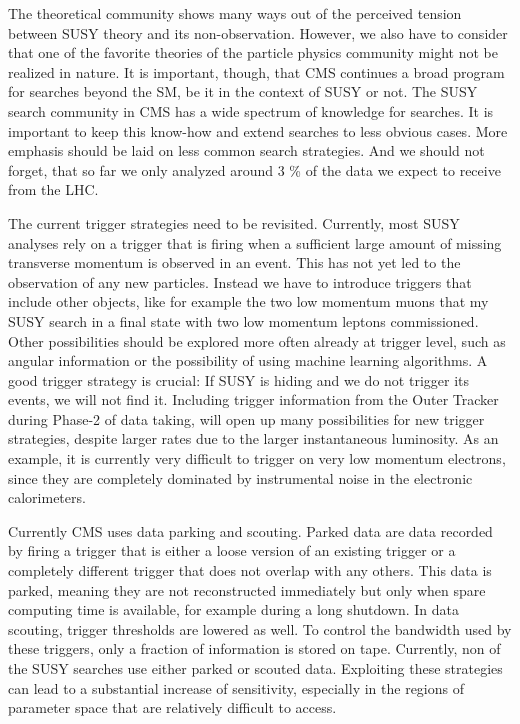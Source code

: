 \documentclass[]{cv} %
\begin{document}
\begin{statement}
The theoretical community shows many ways out of the perceived tension between
SUSY theory and its non-observation. However, we also have to consider that one
of the favorite theories of the particle physics community might not be realized
in nature. It is important, though, that CMS continues a broad program for
searches beyond the SM, be it in the context of SUSY or not. The SUSY search
community in CMS has a wide spectrum of knowledge for searches. It is important
to keep this know-how and extend searches to less obvious cases. More emphasis
should be laid on less common search strategies. And we should not forget, that
so far we only analyzed around 3 \% of the data we expect to receive from the LHC.

The current trigger strategies need to be revisited. Currently, most SUSY
analyses rely on a trigger that is firing when a sufficient large amount of
missing transverse momentum is observed in an event. This has not yet led to the
observation of any new particles. Instead we have to introduce triggers that
include other objects, like for example the two low momentum muons that my SUSY
search in a final state with two low momentum leptons commissioned. Other
possibilities should be explored more often already at trigger level, such as
angular information or the possibility of using machine learning algorithms. A
good trigger strategy is crucial: If SUSY is hiding and we do not trigger its
events, we will not find it. Including trigger information from the Outer
Tracker during Phase-2 of data taking, will open up many possibilities for new
trigger strategies, despite larger rates due to the larger instantaneous
luminosity. As an example, it is currently very difficult to trigger on very low
momentum electrons, since they are completely dominated by instrumental noise in
the electronic calorimeters.

Currently CMS uses data parking and scouting. Parked data are data recorded by
firing a trigger that is either a loose version of an existing trigger or a
completely different trigger that does not overlap with any others. This data is
parked, meaning they are not reconstructed immediately but only when spare
computing time is available, for example during a long shutdown. In data
scouting, trigger thresholds are lowered as well. To control the bandwidth used
by these triggers, only a fraction of information is stored on tape. Currently,
non of the SUSY searches use either parked or scouted data. Exploiting these
strategies can lead to a substantial increase of sensitivity, especially in the
regions of parameter space that are relatively difficult to access.


\end{statement}
\end{document}
